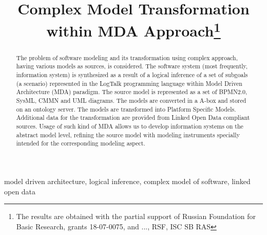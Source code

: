 \documentclass[conference]{IEEEtran}
\begin{document}
\title{Complex Model Transformation within MDA Approach\thanks{The results are obtained with the partial support of Russian Foundation for Basic Research, grants 18-07-0075, and ..., RSF, ISC SB RAS}}


\author{
}




\maketitle

\begin{abstract} %
The problem of software modeling and its transformation using complex approach, having various models as sources, is considered.  The software system (most frequently, information system) is synthesized as a result of a logical inference of a set of subgoals (a scenario) represented in the LogTalk programming language within Model Driven Architecture (MDA) paradigm.  The source model is represented as a set of BPMN2.0, SysML, CMMN and UML diagrams.  The models are converted in a A-box and stored on an ontology server.  The models are transformed into Platform Specific Models.  Additional data for the transformation are provided from Linked Open Data compliant sources.  Usage of such kind of MDA allows us to develop information systems on the abstract model level, refining the source model with modeling instruments specially intended for the corresponding modeling aspect.
\end{abstract}

\begin{IEEEkeywords}
model driven architecture, logical inference, complex model of software, linked open data
\end{IEEEkeywords}
\end{document}
